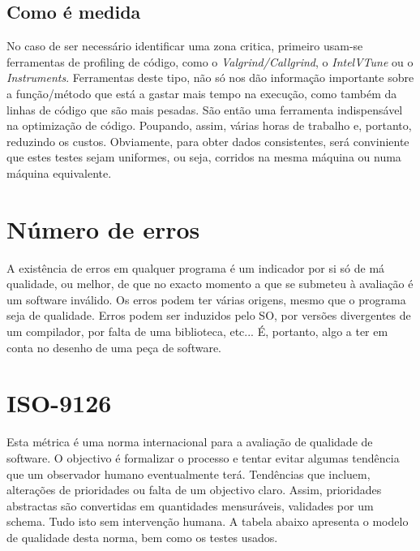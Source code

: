 \documentclass[a4paper,10pt,openright,openbib,twocolumn]{article}
\begin{document}
\subsection{Como é medida}
No caso de ser necessário identificar uma zona critica, primeiro usam-se ferramentas de profiling de código, como o \emph{Valgrind/Callgrind}, o \emph{Intel\textregistered VTune} ou o \emph{Instruments}. Ferramentas deste tipo, não só nos dão informação importante sobre a função/método que está a gastar mais tempo na execução, como também da linhas de código que são mais pesadas. São então uma ferramenta indispensável na optimização de código. Poupando, assim, várias horas de trabalho e, portanto, reduzindo os custos. Obviamente, para obter dados consistentes, será conviniente que estes testes sejam uniformes, ou seja, corridos na mesma máquina ou numa máquina equivalente. 

\section{Número de erros}
A existência de erros em qualquer programa é um indicador por si só de má qualidade, ou melhor, de que no exacto momento a que se submeteu à avaliação é um software inválido. Os erros podem ter várias origens, mesmo que o programa seja de qualidade. Erros podem ser induzidos pelo SO, por versões divergentes de um compilador, por falta de uma biblioteca, etc...
É, portanto, algo a ter em conta no desenho de uma peça de software. 

\section{ISO-9126}
Esta métrica é uma norma internacional para a avaliação de qualidade de software. O objectivo é formalizar o processo e tentar evitar algumas tendência que um observador humano eventualmente terá. Tendências que incluem, alterações de prioridades ou falta de um objectivo claro. Assim, prioridades abstractas são convertidas em quantidades mensuráveis, validades por um schema. Tudo isto sem intervenção humana. 
A tabela abaixo apresenta o modelo de qualidade desta norma, bem como os testes usados.
\end{document}
